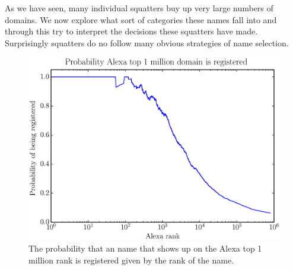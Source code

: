 As we have seen, many individual squatters buy up very large numbers of domains. We now explore what sort of categories these names fall into and through this try to interpret the decisions these squatters have made. Surprisingly squatters do no follow many obvious strategies of name selection.

\begin{figure}
  \centering
  \includegraphics[width=\columnwidth]{figures/alexa_probability}
  \caption{The probability that an name that shows up on the Alexa top 1 million rank is registered given by the rank of the name.}
  \label{fig:alexa_probability}
\end{figure}